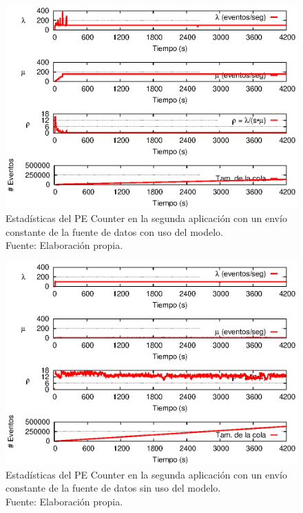 \clearpage

\begin{figure}[!ht]
    \centering
    \captionsetup{justification=centering}
    \includegraphics[scale=1]{images/exp/app2/uniform/cm/statusCounterPE.eps}
    \caption[Estad\'isticas del PE Counter en la segunda aplicaci\'on con un env\'io constante de la fuente de datos con uso del modelo.]{Estad\'isticas del PE Counter en la segunda aplicaci\'on con un env\'io constante de la fuente de datos con uso del modelo.\\Fuente: Elaboraci\'on propia.}
    \label{fig:app2-uniform-statusCounterPE-cm}
\end{figure}

\begin{figure}[!ht]
    \centering
    \captionsetup{justification=centering}
    \includegraphics[scale=1]{images/exp/app2/uniform/sm/statusCounterPE.eps}
    \caption[Estad\'isticas del PE Counter en la segunda aplicaci\'on con un env\'io constante de la fuente de datos sin uso del modelo.]{Estad\'isticas del PE Counter en la segunda aplicaci\'on con un env\'io constante de la fuente de datos sin uso del modelo.\\Fuente: Elaboraci\'on propia.}
    \label{fig:app2-uniform-statusCounterPE-sm}
\end{figure}

